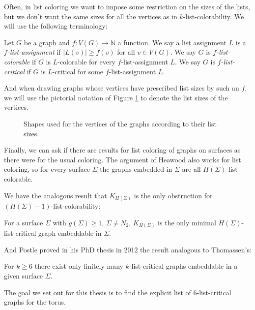 Often, in list coloring we want to impose some restriction on the sizes of the lists, but 
we don't want the same sizes for all the vertices as in $k$-list-colorability. We will
use the following terminology:

\begin{definition}
	Let $G$ be a graph and $f : V(G) \rightarrow \mathbb{N}$ a function. We say a list 
	assignment $L$ is a \emph{$f$-list-assignment} if $|L(v)| \geq f(v)$ for all $v \in V(G)$. 
	We say $G$ is \emph{$f$-list-colorable} if $G$ is $L$-colorable for every 
	$f$-list-assignment $L$.
	We say $G$ is \emph{$f$-list-critical} if $G$ is $L$-critical for some $f$-list-assignment
	$L$.
\end{definition}

And when drawing graphs whose vertices have prescribed list sizes by such an $f$, we
will use the pictorial notation of Figure \ref{fig:listsizenotation} to denote the list sizes
of the vertices.
\begin{figure}[h]

\centering
\begin{tikzpicture}

\end{tikzpicture}
\caption{Shapes used for the vertices of the graphs according to their list sizes.}
\label{fig:listsizenotation}
\end{figure}

Finally, we can ask if there are results for list coloring of graphs on surfaces as there were
for the usual coloring. The argument of Heawood also works for list coloring, so for every
surface $\Sigma$ the graphs embedded in $\Sigma$ are all $H(\Sigma)$-list-colorable.

We have the analogous result that $K_{H(\Sigma)}$ is the only obstruction for
$(H(\Sigma)-1)$-list-colorability:

\begin{theorem}
For a surface $\Sigma$ with $g(\Sigma) \geq 1$, $\Sigma \neq N_2$, $K_{H(\Sigma)}$ is the only
minimal $H(\Sigma)$-list-critical graph embeddable in $\Sigma$.
\end{theorem}

And Postle proved in his PhD thesis in 2012 the result analogous to Thomassen's:

\begin{theorem}
For $k \geq 6$ there exist only finitely many $k$-list-critical graphs embeddable in a given
surface $\Sigma$.
\end{theorem}

The goal we set out for this thesis is to find the explicit list of $6$-list-critical graphs 
for the torus. 



